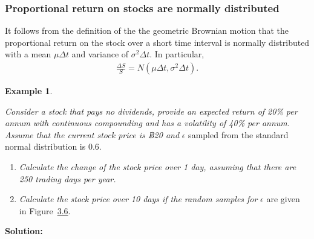 \documentclass[
]{book}
\theoremstyle{definition}
\theoremstyle{definition}
\newtheorem{example}{Example}[chapter]
\theoremstyle{definition}
\theoremstyle{definition}
\theoremstyle{remark}
\begin{document}
\hypertarget{proportional-return-on-stocks-are-normally-distributed}{%
\subsubsection{Proportional return on stocks are normally distributed}\label{proportional-return-on-stocks-are-normally-distributed}}

It follows from the definition of the the geometric Brownian motion that
the proportional return on the stock over a short time interval is
normally distributed with a mean \(\mu \Delta t\) and variance of
\(\sigma^2 \Delta t\). In particular, \[\begin{aligned}
\label{propReturn}
\frac{\Delta S}{S} = N( \mu \Delta t , \sigma^2  \Delta t).\end{aligned}\]

\begin{example}
\protect\hypertarget{exm:unlabeled-div-79}{}\label{exm:unlabeled-div-79}

\emph{Consider a stock that pays no dividends, provide an expected return of
20\% per annum with continuous compounding and has a volatility of 40\%
per annum. Assume that the current stock price is ฿20 and} \(\epsilon\)
sampled from the standard normal distribution is 0.6.

\begin{enumerate}
\def\labelenumi{\arabic{enumi}.}
\item
  \emph{Calculate the change of the stock price over 1 day, assuming that
  there are 250 trading days per year.}
\item
  \emph{Calculate the stock price over 10 days if the random samples for}
  \(\epsilon\) are given in Figure~\protect\hyperlink{fig:GBM}{3.6}.
\end{enumerate}

\end{example}

\textbf{Solution:}
\end{document}
